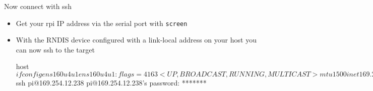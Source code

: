 \begin{frame}
   {Now connect with ssh}

   \begin{itemize}
      \item Get your rpi IP address via the serial port with \verb?screen?
      \item With the RNDIS device configured with a link-local address on your host
	      you can now ssh to the target
      \begin{raw}
host$ ifconfig ens160u4u1
ens160u4u1: flags=4163<UP,BROADCAST,RUNNING,MULTICAST>  mtu 1500
inet 169.254.42.138  netmask 255.255.0.0  broadcast 169.254.255.255
host$ ssh pi@169.254.12.238
pi@169.254.12.238's password: *******
      \end{raw}

   \end{itemize}
\end{frame}

\cprotect\note{


}

